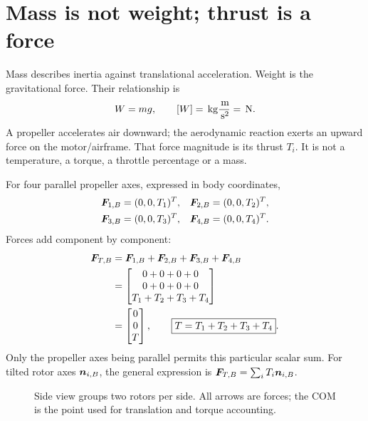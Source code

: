 \section{Mass is not weight; thrust is a force}
Mass describes inertia against translational acceleration. Weight is the
gravitational force. Their relationship is
\begin{equation}
W=mg,\qquad [W]=\,\mathrm{kg}\frac{\,\mathrm{m}}{\,\mathrm{s^2}}=\,\mathrm{N}.
\end{equation}
A propeller accelerates air downward; the aerodynamic reaction exerts an upward
force on the motor/airframe. That force magnitude is its thrust $T_i$.
It is not a temperature, a torque, a throttle percentage or a mass.

For four parallel propeller axes, expressed in body coordinates,
\begin{align}
\bm{F}_{1,B}&=(0,0,T_1)^T,&
\bm{F}_{2,B}&=(0,0,T_2)^T,\\
\bm{F}_{3,B}&=(0,0,T_3)^T,&
\bm{F}_{4,B}&=(0,0,T_4)^T.
\end{align}
Forces add component by component:
\begin{align}
\bm{F}_{T,B}
&=\bm{F}_{1,B}+\bm{F}_{2,B}+\bm{F}_{3,B}+\bm{F}_{4,B}\\
&=\begin{bmatrix}0+0+0+0\\0+0+0+0\\T_1+T_2+T_3+T_4\end{bmatrix}\\
&=\begin{bmatrix}0\\0\\T\end{bmatrix},
\qquad \boxed{T=T_1+T_2+T_3+T_4}.
\end{align}
Only the propeller axes being parallel permits this particular scalar sum.
For tilted rotor axes $\bm{n}_{i,B}$, the general expression is
$\bm{F}_{T,B}=\sum_i T_i\bm{n}_{i,B}$.

\begin{figure}[ht]
\centering
{}
\caption{Side view groups two rotors per side. All arrows are forces; the COM
is the point used for translation and torque accounting.}
\end{figure}

